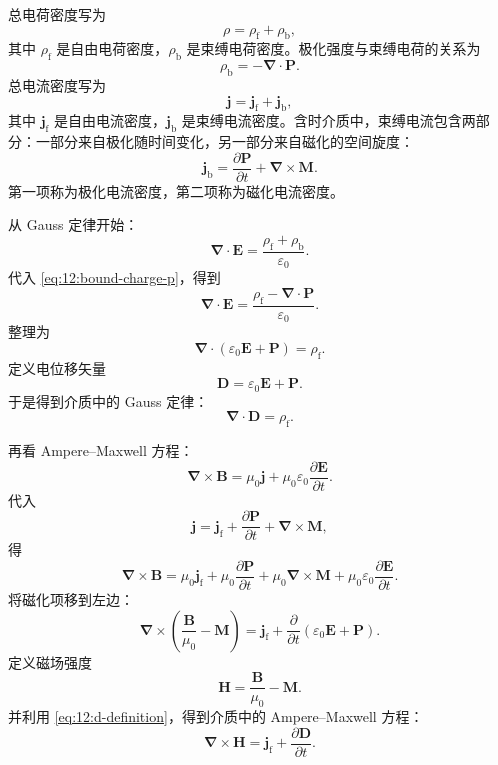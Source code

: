 总电荷密度写为
\[
\rho
=
\rho_{\mathrm{f}}
+
\rho_{\mathrm{b}},
\]
其中 $\rho_{\mathrm{f}}$ 是自由电荷密度，$\rho_{\mathrm{b}}$ 是束缚电荷密度。极化强度与束缚电荷的关系为
\begin{equation}
	\rho_{\mathrm{b}}
	=
	-\bm{\nabla}\cdot\bm{P}.
	\label{eq:12:bound-charge-p}
\end{equation}
总电流密度写为
\[
\bm{j}
=
\bm{j}_{\mathrm{f}}
+
\bm{j}_{\mathrm{b}},
\]
其中 $\bm{j}_{\mathrm{f}}$ 是自由电流密度，$\bm{j}_{\mathrm{b}}$ 是束缚电流密度。含时介质中，束缚电流包含两部分：一部分来自极化随时间变化，另一部分来自磁化的空间旋度：
\begin{equation}
	\bm{j}_{\mathrm{b}}
	=
	\frac{\partial\bm{P}}{\partial t}
	+
	\bm{\nabla}\times\bm{M}.
	\label{eq:12:bound-current-pm}
\end{equation}
第一项称为极化电流密度，第二项称为磁化电流密度。

从 Gauss 定律开始：
\[
\bm{\nabla}\cdot\bm{E}
=
\frac{\rho_{\mathrm{f}}+\rho_{\mathrm{b}}}{\varepsilon_{0}}.
\]
代入 \eqref{eq:12:bound-charge-p}，得到
\[
\bm{\nabla}\cdot\bm{E}
=
\frac{\rho_{\mathrm{f}}-\bm{\nabla}\cdot\bm{P}}{\varepsilon_{0}}.
\]
整理为
\[
\bm{\nabla}\cdot(\varepsilon_{0}\bm{E}+\bm{P})
=
\rho_{\mathrm{f}}.
\]
定义电位移矢量
\begin{equation}
	\bm{D}
	=
	\varepsilon_{0}\bm{E}
	+
	\bm{P}.
	\label{eq:12:d-definition}
\end{equation}
于是得到介质中的 Gauss 定律：
\begin{equation}
	\bm{\nabla}\cdot\bm{D}
	=
	\rho_{\mathrm{f}}.
	\label{eq:12:macroscopic-gauss-d}
\end{equation}

再看 Ampere--Maxwell 方程：
\[
\bm{\nabla}\times\bm{B}
=
\mu_{0}\bm{j}
+
\mu_{0}\varepsilon_{0}
\frac{\partial\bm{E}}{\partial t}.
\]
代入
\[
\bm{j}
=
\bm{j}_{\mathrm{f}}
+
\frac{\partial\bm{P}}{\partial t}
+
\bm{\nabla}\times\bm{M},
\]
得
\[
\bm{\nabla}\times\bm{B}
=
\mu_{0}\bm{j}_{\mathrm{f}}
+
\mu_{0}\frac{\partial\bm{P}}{\partial t}
+
\mu_{0}\bm{\nabla}\times\bm{M}
+
\mu_{0}\varepsilon_{0}
\frac{\partial\bm{E}}{\partial t}.
\]
将磁化项移到左边：
\[
\bm{\nabla}\times
\left(
\frac{\bm{B}}{\mu_{0}}-\bm{M}
\right)
=
\bm{j}_{\mathrm{f}}
+
\frac{\partial}{\partial t}
(\varepsilon_{0}\bm{E}+\bm{P}).
\]
定义磁场强度
\begin{equation}
	\bm{H}
	=
	\frac{\bm{B}}{\mu_{0}}
	-
	\bm{M}.
	\label{eq:12:h-definition}
\end{equation}
并利用 \eqref{eq:12:d-definition}，得到介质中的 Ampere--Maxwell 方程：
\begin{equation}
	\bm{\nabla}\times\bm{H}
	=
	\bm{j}_{\mathrm{f}}
	+
	\frac{\partial\bm{D}}{\partial t}.
	\label{eq:12:macroscopic-ampere-h}
\end{equation}

